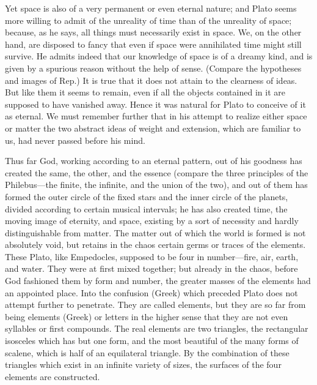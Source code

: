 Yet space is also of a very permanent or even eternal nature; and Plato
seems more willing to admit of the unreality of time than of the unreality
of space; because, as he says, all things must necessarily exist in space.
We, on the other hand, are disposed to fancy that even if space were
annihilated time might still survive. He admits indeed that our knowledge
of space is of a dreamy kind, and is given by a spurious reason without
the help of sense. (Compare the hypotheses and images of Rep.) It is true
that it does not attain to the clearness of ideas. But like them it seems
to remain, even if all the objects contained in it are supposed to have
vanished away. Hence it was natural for Plato to conceive of it as
eternal. We must remember further that in his attempt to realize either
space or matter the two abstract ideas of weight and extension, which are
familiar to us, had never passed before his mind.

Thus far God, working according to an eternal pattern, out of his goodness
has created the same, the other, and the essence (compare the three
principles of the Philebus—the finite, the infinite, and the union
of the two), and out of them has formed the outer circle of the fixed
stars and the inner circle of the planets, divided according to certain
musical intervals; he has also created time, the moving image of eternity,
and space, existing by a sort of necessity and hardly distinguishable from
matter. The matter out of which the world is formed is not absolutely
void, but retains in the chaos certain germs or traces of the elements.
These Plato, like Empedocles, supposed to be four in number—fire,
air, earth, and water. They were at first mixed together; but already in
the chaos, before God fashioned them by form and number, the greater
masses of the elements had an appointed place. Into the confusion (Greek)
which preceded Plato does not attempt further to penetrate. They are
called elements, but they are so far from being elements (Greek) or
letters in the higher sense that they are not even syllables or first
compounds. The real elements are two triangles, the rectangular isosceles
which has but one form, and the most beautiful of the many forms of
scalene, which is half of an equilateral triangle. By the combination of
these triangles which exist in an infinite variety of sizes, the surfaces
of the four elements are constructed.

